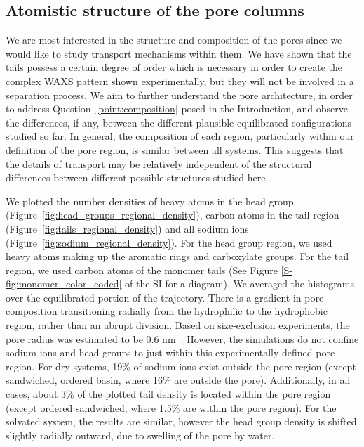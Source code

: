 \documentclass[journal=jpcbfk,manuscript=article]{achemso}
\begin{document}
  \subsection{Atomistic structure of the pore columns}

  We are most interested in the structure and composition of the pores since we
  would like to study transport mechanisms within them. We have shown that the
  tails possess a certain degree of order which is necessary in order to create
  the complex WAXS pattern shown experimentally, but they will not be involved in
  a separation process. We aim to further understand the pore architecture, in
  order to address Question~\ref{point:composition} posed in the Introduction, 
  and observe the differences, if any, between the different plausible equilibrated
  configurations studied so far. In general, the composition of each region, particularly within our
  definition of the pore region, is similar between all systems. This suggests
  that the details of transport may be relatively independent of the structural
  differences between different possible structures studied here.

  We plotted the number densities of heavy atoms in the head group 
  (Figure~\ref{fig:head_groups_regional_density}), carbon atoms in the tail region 
  (Figure~\ref{fig:tails_regional_density}) and all sodium ions 
  (Figure~\ref{fig:sodium_regional_density}). For the head group region, we used heavy
  atoms making up the aromatic rings and carboxylate groups. For the tail region, we
  used carbon atoms of the monomer tails (See Figure \ref{S-fig:monomer_color_coded}
  of the SI for a diagram). We averaged the histograms over the equilibrated
  portion of the trajectory. 
  There is a gradient in pore composition transitioning radially from the hydrophilic 
  to the hydrophobic region, rather than an abrupt division. Based on size-exclusion 
  experiments, the pore radius was estimated to be 0.6 nm~\cite{zhou_supported_2005}. 
  However, the simulations do not confine
  sodium ions and head groups to just within this experimentally-defined pore region. For dry systems,
  19\% of sodium ions exist outside the pore region (except sandwiched, ordered basin,
  where 16\% are outside the pore). Additionally, in all cases, about 
  3\% of the plotted tail density is located within the pore region (except ordered sandwiched,
  where 1.5\% are within the pore region). For the solvated system, the results are similar,
  however the head group density is shifted slightly radially outward, due to
  swelling of the pore by water. 
\end{document}
